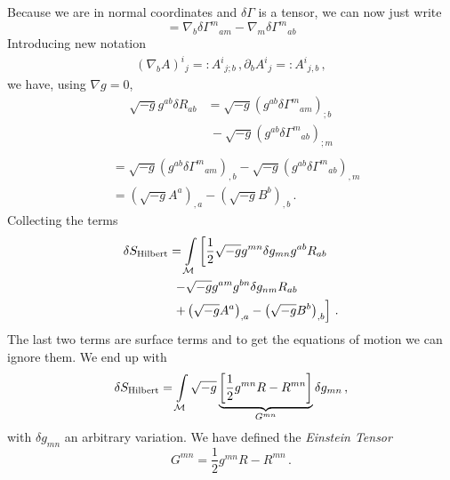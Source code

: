 \begin{itemize}
        Because we are in normal coordinates and $\delta \Gamma$ is a tensor, we can now just write
        \begin{equation*}
            = \nabla_b \delta \Gamma^{m}{}_{am} - \nabla_m \delta \Gamma^m{}_{ab}
        \end{equation*}
        Introducing new notation
        \begin{align}
            (\nabla_b A)^i{}_j =: A^i{}_{j;b}\,,
            \partial_b A^i{}_j =: A^i{}_{j,b}\,,
        \end{align}
        we have, using $\nabla g = 0$,
        \begin{align*}
            \sqrt{-g} g^{ab} \delta R_{ab} &= \sqrt{-g} \left( g^{ab} \delta \Gamma^m{}_{am} \right)_{;b}\\
             &~- \sqrt{-g} \left( g^{ab} \delta \Gamma^m{}_{ab} \right)_{;m}\\
        \end{align*}
        \begin{align*}
             &= \sqrt{-g} \left( g^{ab} \delta \Gamma^m{}_{am} \right)_{,b} - 
              \sqrt{-g} \left( g^{ab} \delta \Gamma^m{}_{ab} \right)_{,m}\\
              &= \left(\sqrt{-g} A^a\right)_{,a} - \left( \sqrt{-g} B^b \right)_{,b}\,.
        \end{align*}
        Collecting the terms
        \begin{align*}
            \delta S_\text{Hilbert} &= \int\limits_{\mathcal{M}}
            \left[ \frac{1}{2} \sqrt{-g} g^{mn} \delta g_{mn} g^{ab}R_{ab}\right.\\
        &~\left.- \sqrt{-g} g^{am}g^{bn}\delta g_{nm}R_{ab} \right. \\
        &~\left.+ \left( \sqrt{-g} A^a \right)_{,a} - \left( \sqrt{-g} B^b \right)_{,b} \right]\,.
        \end{align*}
        The last two terms are surface terms and to get the equations of motion we can ignore them.
        We end up with
        \begin{equation}
            \delta S_\text{Hilbert} = \int\limits_{\mathcal{M}} \sqrt{-g}
            \underbrace{\left[ \frac{1}{2} g^{mn} R - R^{mn} \right]}_{G^{mn}} \delta g_{mn}\,,
        \end{equation}
        with $\delta g_{mn}$ an arbitrary variation.
        We have defined the \textit{Einstein Tensor}
        \begin{equation}
            G^{mn} = \frac{1}{2} g^{mn} R - R^{mn}\,.
        \end{equation}

\end{itemize}
